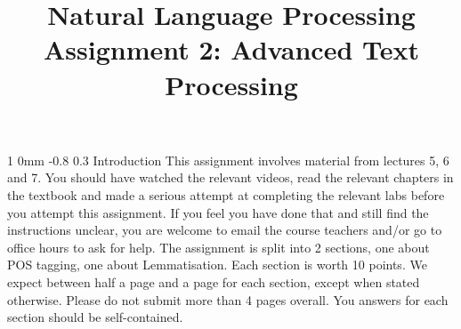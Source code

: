 \documentclass[11pt]{article}
\title{{\LARGE Natural Language Processing}\\[1.5mm]{\large Assignment 2: Advanced Text Processing}}%
\author{}
\date{} %
\makeatletter
\renewcommand{\section}{\@startsection
{section}%
{1}%
{0mm}%
{-0.8\baselineskip}%
{0.3\baselineskip}%
{\bfseries\large}}%
\makeatother
\begin{document}


\maketitle

\section{Introduction}
\noindent This assignment involves material from lectures 5, 6 and
7. You should have watched the relevant videos, read the relevant
chapters in the textbook and made a serious attempt at completing the
relevant labs before you attempt this assignment. If you feel you have
done that and still find the instructions unclear, you are welcome to
email the course teachers and/or go to office hours to ask for help.
The assignment is split into 2 sections, one about POS tagging,
one about Lemmatisation. Each section is worth 10 points. We
expect between half a page and a page for each section, except when
stated otherwise. Please do not submit more than 4 pages overall.  You
answers for each section should be self-contained.  %
\end{document}
